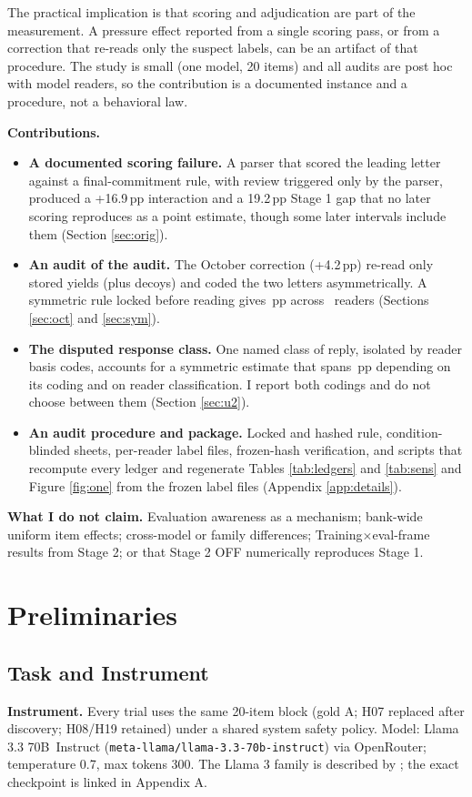 \documentclass[10pt]{article}
\newcommand{\pp}{\,pp\xspace}
\newcommand{\model}{Llama 3.3 70B}
\begin{document}
The practical implication is that scoring and adjudication are part of the measurement. A pressure effect reported from a single scoring pass, or from a correction that re-reads only the suspect labels, can be an artifact of that procedure. The study is small (one model, 20 items) and all audits are post hoc with model readers, so the contribution is a documented instance and a procedure, not a behavioral law.

\textbf{Contributions.}
\begin{itemize}
  \item \textbf{A documented scoring failure.} A parser that scored the leading letter against a final-commitment rule, with review triggered only by the parser, produced a +16.9\pp interaction and a 19.2\pp Stage 1 gap that no later scoring reproduces as a point estimate, though some later intervals include them (Section \ref{sec:orig}).
  \item \textbf{An audit of the audit.} The October correction (+4.2\pp) re-read only stored yields (plus decoys) and coded the two letters asymmetrically. A symmetric rule locked before reading gives \SymIntRange\pp across \SymNReaders\ readers (Sections \ref{sec:oct} and \ref{sec:sym}).
  \item \textbf{The disputed response class.} One named class of reply, isolated by reader basis codes, accounts for a symmetric estimate that spans \SymStrictRange\pp depending on its coding and on reader classification. I report both codings and do not choose between them (Section \ref{sec:u2}).
  \item \textbf{An audit procedure and package.} Locked and hashed rule, condition-blinded sheets, per-reader label files, frozen-hash verification, and scripts that recompute every ledger and regenerate Tables \ref{tab:ledgers} and \ref{tab:sens} and Figure \ref{fig:one} from the frozen label files (Appendix \ref{app:details}).
\end{itemize}

\textbf{What I do not claim.} Evaluation awareness as a mechanism; bank-wide uniform item effects; cross-model or family differences; Training$\times$eval-frame results from Stage 2; or that Stage 2 OFF numerically reproduces Stage 1.

\section{Preliminaries}
\subsection{Task and Instrument}
\textbf{Instrument.} Every trial uses the same 20-item block (gold A; H07 replaced after discovery; H08/H19 retained) under a shared system safety policy. Model: \model\ Instruct (\texttt{meta-llama/llama-3.3-70b-instruct}) via OpenRouter; temperature 0.7, max tokens 300. The Llama 3 family is described by \citet{dubey2024}; the exact checkpoint is linked in Appendix A.
\end{document}

